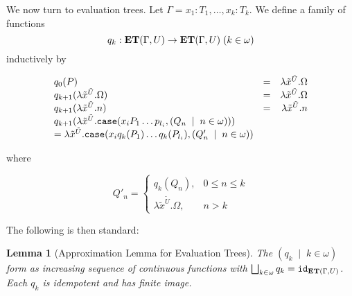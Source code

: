 \documentclass[11pt]{article}
\newtheorem{lemma}[theorem]{Lemma}
\begin{document}
We now turn to evaluation trees. Let
$\Gamma=x_1:T_1,\dots,x_k:T_k$. We define a family of functions
$$q_k:{\bf ET}(\Gamma,U)\rightarrow {\bf ET}(\Gamma,U) \;(k\in\omega)$$
inductively by

\[
\begin{array}{lcr}
q_0(P) & = & \lambda \tilde{x}^{\tilde{U}}.\Omega \\
q_{k+1}(\lambda \tilde{x}^{\tilde{U}}.\Omega) &=& \lambda
\tilde{x}^{\tilde{U}}.\Omega \\
q_{k+1}(\lambda \tilde{x}^{\tilde{U}}.n) &=& \lambda
\tilde{x}^{\tilde{U}}.n \\
q_{k+1}(\lambda \tilde{x}^{\tilde{U}}.{\tt case}(x_i P_1\dots
p_{l_i},(Q_n\;\mid \; n\in\omega))) & & \\
=\lambda \tilde{x}^{\tilde{U}}.{\tt case}(x_i q_k(P_1)\dots
q_k(P_{l_i}),(Q'_n\;\mid \; n\in\omega)) & &
\end{array}
\]

where

\[
Q'_n= \left\{ \begin{array}{cc}
q_k(Q_n) , & 0\leq n\leq k\\
\lambda \tilde{x}^{\tilde{U}}.\Omega, & n> k
\end{array}
\right. \]

The following is then standard:
\begin{lemma}[Approximation Lemma for Evaluation Trees]\label{alet}
The $(q_k\;\mid \; k\in\omega)$ form as increasing sequence of
continuous functions with $\bigsqcup_{k\in\omega} q_k={\tt
id}_{{\bf ET}(\Gamma,U)}$. Each $q_k$ is idempotent and has finite
image.
\end{lemma}
\end{document}
